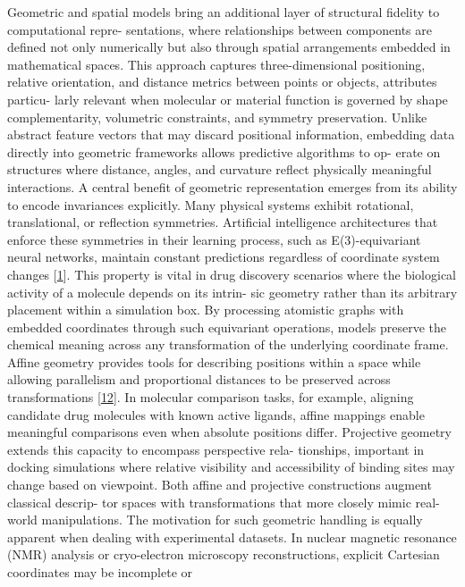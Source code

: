 \documentclass[
]{article}
\begin{document}
Geometric and spatial models bring an additional layer of structural
fidelity to computational repre- sentations, where relationships between
components are defined not only numerically but also through spatial
arrangements embedded in mathematical spaces. This approach captures
three-dimensional positioning, relative orientation, and distance
metrics between points or objects, attributes particu- larly relevant
when molecular or material function is governed by shape
complementarity, volumetric constraints, and symmetry preservation.
Unlike abstract feature vectors that may discard positional information,
embedding data directly into geometric frameworks allows predictive
algorithms to op- erate on structures where distance, angles, and
curvature reflect physically meaningful interactions. A central benefit
of geometric representation emerges from its ability to encode
invariances explicitly. Many physical systems exhibit rotational,
translational, or reflection symmetries. Artificial intelligence
architectures that enforce these symmetries in their learning process,
such as E(3)-equivariant neural networks, maintain constant predictions
regardless of coordinate system changes {[}\hyperref[_bookmark41]{1}{]}.
This property is vital in drug discovery scenarios where the biological
activity of a molecule depends on its intrin- sic geometry rather than
its arbitrary placement within a simulation box. By processing atomistic
graphs with embedded coordinates through such equivariant operations,
models preserve the chemical meaning across any transformation of the
underlying coordinate frame. Affine geometry provides tools for
describing positions within a space while allowing parallelism and
proportional distances to be preserved across transformations
{[}\hyperref[_bookmark52]{12}{]}. In molecular comparison tasks, for
example, aligning candidate drug molecules with known active ligands,
affine mappings enable meaningful comparisons even when absolute
positions differ. Projective geometry extends this capacity to encompass
perspective rela- tionships, important in docking simulations where
relative visibility and accessibility of binding sites may change based
on viewpoint. Both affine and projective constructions augment classical
descrip- tor spaces with transformations that more closely mimic
real-world manipulations. The motivation for such geometric handling is
equally apparent when dealing with experimental datasets. In nuclear
magnetic resonance (NMR) analysis or cryo-electron microscopy
reconstructions, explicit Cartesian coordinates may be incomplete or
\end{document}

